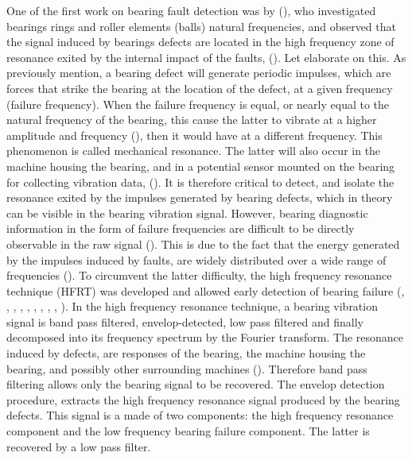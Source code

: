 \documentclass[../Main/thesis.tex]{subfiles}
\begin{document}
\justify
One of the first work on bearing fault detection was by (\cite{balderston1969}), who investigated bearings rings and roller elements (balls) natural frequencies, and observed that the signal induced by bearings defects are located in the high frequency zone of resonance exited by the internal impact of the faults, (\cite{randal2010}). Let elaborate on this. As previously mention, a bearing defect will generate periodic impulses, which are forces that strike the bearing at the location of the defect, at a given frequency (failure frequency). When the failure frequency is equal, or nearly equal to the natural frequency of the bearing, this cause the latter to vibrate at a higher amplitude and frequency (\cite{mcfadden1984a}), then it would have at a different frequency. This phenomenon is called mechanical resonance. The latter will also occur in the machine housing the bearing, and in a potential sensor mounted on the bearing for collecting vibration data, (\cite{mcfadden1984a}).
\justify
 It is therefore critical to detect, and isolate the resonance exited by the impulses generated by bearing defects, which in theory can be visible in the bearing vibration signal. However, bearing diagnostic information in the form of failure frequencies are  difficult to be directly observable in the raw signal (\cite{randal2010}). This is due to the fact that the energy generated by the impulses induced by faults, are widely distributed over a wide range of frequencies (\cite{randal2010}).
 \justify
 To circumvent the latter difficulty, the high frequency resonance technique (HFRT) was developed and  allowed early detection of bearing failure (\cite{broderick1972}, \cite{burchill1973}, \cite{burchill1973b}, \cite{darlow1974}, \cite{darlow1975}, \cite{darlow1975b}, \cite{board1975},  \cite{randal2010}, \cite{gupta2016}, \cite{khadersab2018}).
In the high frequency resonance technique, a bearing vibration signal is  band pass filtered, envelop-detected, low pass filtered and finally decomposed into its frequency spectrum by the Fourier transform.
\justify
 The resonance induced by defects, are responses of the bearing, the machine housing the bearing, and possibly other surrounding machines (\cite{mcfadden1984a}). Therefore band pass filtering allows only the bearing signal to be recovered.
 The envelop detection procedure, extracts the high frequency resonance signal produced by the bearing defects. This signal is a made of two components: the high frequency resonance component and the low frequency bearing failure component. The latter is recovered by a low pass filter. 
\end{document}
